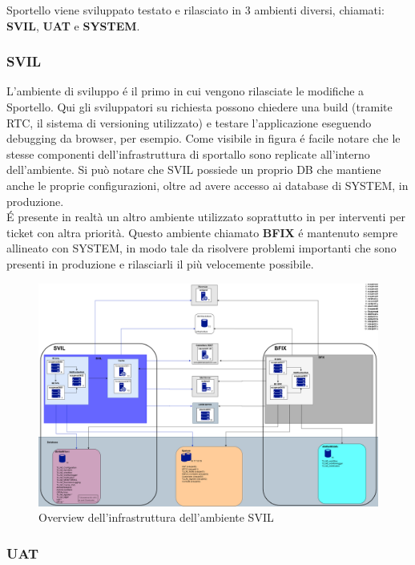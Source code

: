 Sportello viene sviluppato testato e rilasciato in 3 ambienti diversi, chiamati: \textbf{SVIL}, \textbf{UAT} e \textbf{SYSTEM}.

\subsubsection{SVIL}

L'ambiente di sviluppo é il primo in cui vengono rilasciate le modifiche a Sportello. Qui gli sviluppatori su richiesta possono chiedere una build (tramite RTC, il sistema di versioning utilizzato) e testare l'applicazione eseguendo debugging da browser, per esempio. Come visibile in figura é facile notare che le stesse componenti dell'infrastruttura di sportallo sono replicate all'interno dell'ambiente. Si può notare che SVIL possiede un proprio DB che mantiene anche le proprie configurazioni, oltre ad avere accesso ai database di SYSTEM, in produzione. \\
É presente in realtà un altro ambiente utilizzato soprattutto in per interventi per ticket con altra priorità. Questo ambiente chiamato \textbf{BFIX} é mantenuto sempre allineato con SYSTEM, in modo tale da risolvere problemi importanti che sono presenti in produzione e rilasciarli il più velocemente possibile. 


\begin{figure}[h!]
    \centering
	\includegraphics[width=\textwidth]{./res/img/svil-diag.png}
    \caption{Overview dell'infrastruttura dell'ambiente SVIL}
\end{figure}

\subsubsection{UAT}

